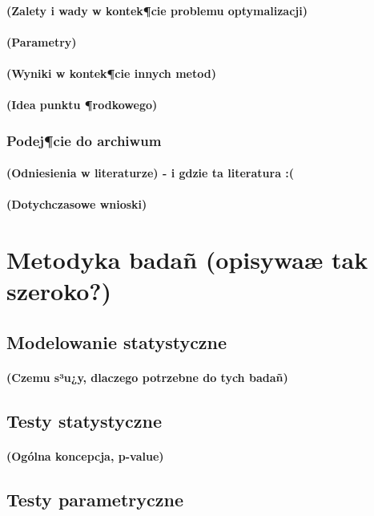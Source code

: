 \documentclass[11pt]{report}
\begin{document}
\paragraph{
(Zalety i wady w kontek¶cie problemu optymalizacji)
}
\paragraph{
(Parametry)
}
\paragraph{
(Wyniki w kontek¶cie innych metod)
}
\paragraph{
(Idea punktu ¶rodkowego)
}

\subsubsection{Podej¶cie do archiwum}
\paragraph{(Odniesienia w literaturze) - i gdzie ta literatura :(}
\paragraph{(Dotychczasowe wnioski)}

\section{Metodyka badañ (opisywaæ tak szeroko?)}
\subsection{Modelowanie statystyczne}
\paragraph{
(Czemu s³u¿y, dlaczego potrzebne do tych badañ)
}
\subsection{Testy statystyczne}
\paragraph{
(Ogólna koncepcja, p-value)
}
\subsection{Testy parametryczne}
\end{document}
